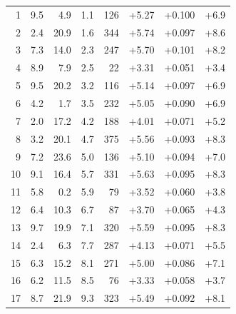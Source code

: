 \begin{longtable}{@{}r r r r r r r r@{}}
1 & 9.5 & 4.9 & 1.1 & 126 & \cellcolor{green!65}+5.27 & \cellcolor{yellow!70}+0.100 & \cellcolor{orange!59}+6.9 \\
2 & 2.4 & 20.9 & 1.6 & 344 & \cellcolor{green!70}+5.74 & \cellcolor{yellow!68}+0.097 & \cellcolor{orange!70}+8.6 \\
3 & 7.3 & 14.0 & 2.3 & 247 & \cellcolor{green!70}+5.70 & \cellcolor{yellow!70}+0.101 & \cellcolor{orange!68}+8.2 \\
4 & 8.9 & 7.9 & 2.5 & 22 & \cellcolor{green!45}+3.31 & \cellcolor{yellow!41}+0.051 & \cellcolor{orange!35}+3.4 \\
5 & 9.5 & 20.2 & 3.2 & 116 & \cellcolor{green!64}+5.14 & \cellcolor{yellow!68}+0.097 & \cellcolor{orange!59}+6.9 \\
6 & 4.2 & 1.7 & 3.5 & 232 & \cellcolor{green!63}+5.05 & \cellcolor{yellow!64}+0.090 & \cellcolor{orange!59}+6.9 \\
7 & 2.0 & 17.2 & 4.2 & 188 & \cellcolor{green!52}+4.01 & \cellcolor{yellow!53}+0.071 & \cellcolor{orange!47}+5.2 \\
8 & 3.2 & 20.1 & 4.7 & 375 & \cellcolor{green!68}+5.56 & \cellcolor{yellow!66}+0.093 & \cellcolor{orange!68}+8.3 \\
9 & 7.2 & 23.6 & 5.0 & 136 & \cellcolor{green!63}+5.10 & \cellcolor{yellow!66}+0.094 & \cellcolor{orange!60}+7.0 \\
10 & 9.1 & 16.4 & 5.7 & 331 & \cellcolor{green!69}+5.63 & \cellcolor{yellow!67}+0.095 & \cellcolor{orange!68}+8.3 \\
11 & 5.8 & 0.2 & 5.9 & 79 & \cellcolor{green!47}+3.52 & \cellcolor{yellow!46}+0.060 & \cellcolor{orange!38}+3.8 \\
12 & 6.4 & 10.3 & 6.7 & 87 & \cellcolor{green!49}+3.70 & \cellcolor{yellow!49}+0.065 & \cellcolor{orange!41}+4.3 \\
13 & 9.7 & 19.9 & 7.1 & 320 & \cellcolor{green!68}+5.59 & \cellcolor{yellow!66}+0.095 & \cellcolor{orange!68}+8.3 \\
14 & 2.4 & 6.3 & 7.7 & 287 & \cellcolor{green!53}+4.13 & \cellcolor{yellow!53}+0.071 & \cellcolor{orange!49}+5.5 \\
15 & 6.3 & 15.2 & 8.1 & 271 & \cellcolor{green!62}+5.00 & \cellcolor{yellow!62}+0.086 & \cellcolor{orange!60}+7.1 \\
16 & 6.2 & 11.5 & 8.5 & 76 & \cellcolor{green!45}+3.33 & \cellcolor{yellow!45}+0.058 & \cellcolor{orange!37}+3.7 \\
17 & 8.7 & 21.9 & 9.3 & 323 & \cellcolor{green!67}+5.49 & \cellcolor{yellow!65}+0.092 & \cellcolor{orange!67}+8.1 \\

\end{longtable}
